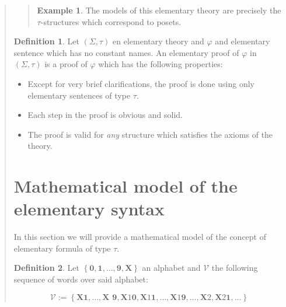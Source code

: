 \documentclass[a4paper, 12pt]{article}
\theoremstyle{definition}
\theoremstyle{definition}
\newtheorem{example}{Example}
\theoremstyle{definition}
\newtheorem{definition}{Definition}
\begin{document}
\begin{quote}
\begin{quote}
\begin{example}
    The models of this elementary theory are precisely the $\tau$-structures 
    which correspond to posets.

\end{example}

\end{quote}
\normalsize

\begin{definition}
    Let $(\Sigma, \tau)$ en elementary theory and $\varphi$ and elementary 
    sentence which has no constant names. An elementary 
    proof of $\varphi$ in $(\Sigma, \tau)$ is a proof of $\varphi$
    which has the following properties: 

    \begin{itemize}
        \item Except for very brief clarifications, the proof is done using 
            only elementary sentences of type $\tau$.
        \item Each step in the proof is obvious and solid. 
        \item The proof is valid for \textit{any} structure which satisfies 
            the axioms of the theory.
    \end{itemize}
\end{definition}

\pagebreak 

\section{Mathematical model of the elementary syntax}

In this section we will provide a mathematical model of the concept of 
elementary formula of type $\tau$.

\begin{definition}
    Let $\left\{ \textbf{0}, \textbf{1}, \ldots, \textbf{9}, \textbf{X}
    \right\} $ an alphabet and $\mathcal{V}$ the following sequence of words
    over said alphabet:

    \begin{equation*}
        \mathcal{V} := \left\{ \textbf{X1}, \ldots, \textbf{X 9}, \textbf{X}\textit{1}\textbf{0}, \textbf{X}\textit{1}\textbf{1},\ldots, \textbf{X}\textit{1}\textbf{9}, \ldots, \textbf{X}\textit{2}, \textbf{X}\textit{2}\textbf{1}, \ldots \right\} 
    \end{equation*}
\end{definition}


\end{quote}
\end{document}
